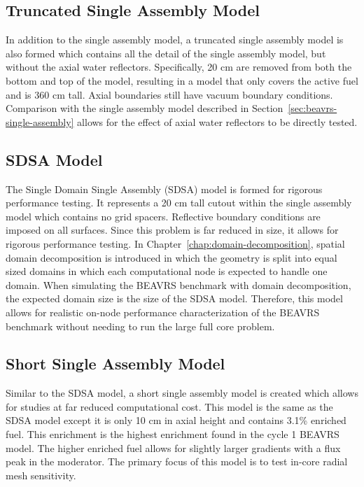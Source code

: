 \subsection{Truncated Single Assembly Model}
\label{sec:trunc-single-assembly}

In addition to the single assembly model, a truncated single assembly model is also formed which contains all the detail of the single assembly model, but without the axial water reflectors. Specifically, 20 cm are removed from both the bottom and top of the model, resulting in a model that only covers the active fuel and is 360 cm tall. Axial boundaries still have vacuum boundary conditions. Comparison with the single assembly model described in Section~\ref{sec:beavrs-single-assembly} allows for the effect of axial water reflectors to be directly tested.

\subsection{SDSA Model}
\label{sec:sdsa}

The Single Domain Single Assembly (SDSA) model is formed for rigorous performance testing. It represents a 20 cm tall cutout within the single assembly model which contains no grid spacers. Reflective boundary conditions are imposed on all surfaces. Since this problem is far reduced in size, it allows for rigorous performance testing. In Chapter~\ref{chap:domain-decomposition}, spatial domain decomposition is introduced in which the geometry is split into equal sized domains in which each computational node is expected to handle one domain. When simulating the BEAVRS benchmark with domain decomposition, the expected domain size is the size of the SDSA model. Therefore, this model allows for realistic on-node performance characterization of the BEAVRS benchmark without needing to run the large full core problem.

\subsection{Short Single Assembly Model}
\label{sec:short-single-assembly}

Similar to the SDSA model, a short single assembly model is created which allows for studies at far reduced computational cost. This model is the same as the SDSA model except it is only 10 cm in axial height and contains 3.1\% enriched fuel. This enrichment is the highest enrichment found in the cycle 1 BEAVRS model. The higher enriched fuel allows for slightly larger gradients with a flux peak in the moderator. The primary focus of this model is to test in-core radial mesh sensitivity.


